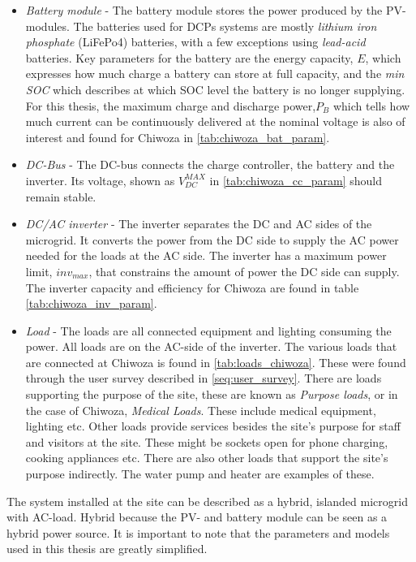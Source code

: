 \begin{itemize}
    \item \textit{Battery module}   -   The battery module stores the power produced by the PV-modules. The batteries used for DCPs systems are mostly \textit{lithium iron phosphate} (LiFePo4) batteries, with a few exceptions using \textit{lead-acid} batteries. Key parameters for the battery are the energy capacity, $E$, which expresses how much charge a battery can store at full capacity, and the \textit{min SOC} which describes at which SOC level the battery is no longer supplying. For this thesis, the maximum charge and discharge power,$P_B$ which tells how much current can be continuously delivered at the nominal voltage is also of interest and found for Chiwoza in \autoref{tab:chiwoza_bat_param}.  
    
    \item \textit{DC-Bus}   -   The DC-bus connects the charge controller, the battery and the inverter. Its voltage, shown as $V^{MAX}_{DC}$ in \autoref{tab:chiwoza_cc_param} should remain stable.
    
    \item \textit{DC/AC inverter}   -   The inverter separates the DC and AC sides of the microgrid. It converts the power from the DC side to supply the AC power needed for the loads at the AC side. The inverter has a maximum power limit, $inv_{max}$, that constrains the amount of power the DC side can supply. The inverter capacity and efficiency for Chiwoza are found in table \ref{tab:chiwoza_inv_param}. 
    
    \item \textit{Load}   -   The loads are all connected equipment and lighting consuming the power. All loads are on the AC-side of the inverter. The various loads that are connected at Chiwoza is found in \autoref{tab:loads_chiwoza}. These were found through the user survey described in \autoref{seq:user_survey}. There are loads supporting the purpose of the site, these are known as \textit{Purpose loads}, or in the case of Chiwoza, \textit{Medical Loads}. These include medical equipment, lighting etc. Other loads provide services besides the site's purpose for staff and visitors at the site. These might be sockets open for phone charging, cooking appliances etc. There are also other loads that support the site's purpose indirectly. The water pump and heater are examples of these. 
\end{itemize}
The system installed at the site can be described as a hybrid, islanded microgrid with AC-load. Hybrid because the PV- and battery module can be seen as a hybrid power source. It is important to note that the parameters and models used in this thesis are greatly simplified. 



